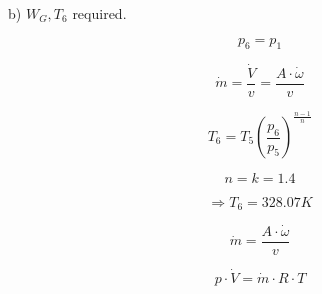 b) \( W_G, T_6 \) required.

\[
p_6 = p_1
\]

\[
\dot{m} = \frac{\dot{V}}{v} = \frac{A \cdot \dot{\omega}}{v}
\]

\[
T_6 = T_5 \left( \frac{p_6}{p_5} \right)^{\frac{n-1}{n}}
\]

\[
n = k = 1.4
\]

\[
\Rightarrow T_6 = 328.07 K
\]

\[
\dot{m} = \frac{A \cdot \dot{\omega}}{v}
\]

\[
p \cdot \dot{V} = \dot{m} \cdot R \cdot T
\]